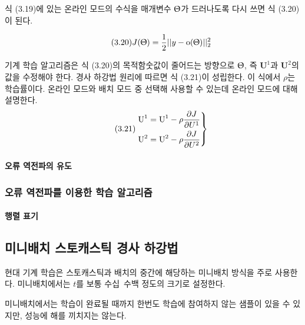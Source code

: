 \documentclass [12pt] {oblivoir}
\let\oldsubsubsection=\subsubsection
\renewcommand{\subsubsection}
{
  \filbreak
  \oldsubsubsection
}
\begin{document}
식 (3.19)에 있는 온라인 모드의 수식을 매개변수 $\Uptheta$가 드러나도록 다시 쓰면 식 (3.20)이 된다.

\begin{equation} \tag{3.20}
  J(\Uptheta) = \frac{1}{2}||y - \boldsymbol{\text{o}}(\Uptheta)||_{2}^{2}
\end{equation}

\vspace{3mm}
기계 학습 알고리즘은 식 (3.20)의 목적함숫값이 줄어드는 방향으로 $\Uptheta$, 즉 $\boldsymbol{\text{U}}^{1}$과 $\boldsymbol{\text{U}}^{2}$의 값을 수정해야 한다.
경사 하강법 원리에 따르면 식 (3.21)이 성립한다. 이 식에서 $\rho$는 학습률이다. 온라인 모드와 배치 모드 중 선택해 사용할 수 있는데 온라인 모드에 대해 설명한다.
\begin{equation} \tag{3.21}
  \begin{rcases}
    \boldsymbol{\text{U}}^{1} = \boldsymbol{\text{U}}^{1} - \displaystyle\rho\frac{\partial J}{\partial U^{1}} \\
    \boldsymbol{\text{U}}^{2} = \boldsymbol{\text{U}}^{2} - \displaystyle\rho\frac{\partial J}{\partial U^{2}}
  \end{rcases}
\end{equation}

\paragraph*{오류 역전파의 유도}\mbox{}

\subsubsection{오류 역전파를 이용한 학습 알고리즘}

\paragraph*{행렬 표기}\mbox{}

\subsection{미니배치 스토캐스틱 경사 하강법}

현대 기계 학습은 스토캐스틱과 배치의 중간에 해당하는 미니배치 방식을 주로 사용한다.
미니배치에서는 $t$를 보통 수십~수백 정도의 크기로 설정한다.

미니배치에서는 학습이 완료될 때까지 한번도 학습에 참여하지 않는 샘플이 있을 수 있지만, 성능에 해를 끼치지는 않는다.
\end{document}

